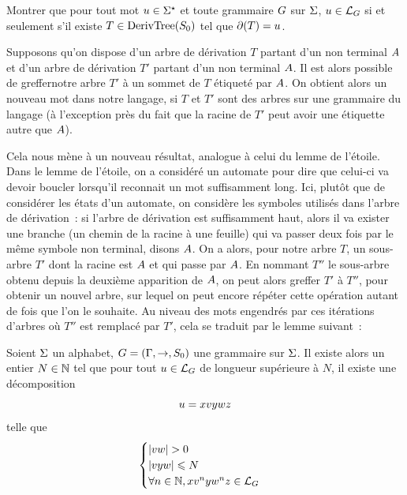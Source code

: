 \begin{exercise}
  Montrer que pour tout mot $u\in\Sigma^{\star}$ et toute grammaire $G$ sur
  $\Sigma$, $u \in \mathcal L_{G}$ si et seulement s'il existe
  $T \in \operatorname{DerivTree}(S_{0})$ tel que $\mathbin{\partial}(T) = u$.
\end{exercise}

Supposons qu'on dispose d'un arbre de dérivation $T$ partant d'un non terminal
$A$ et d'un arbre de dérivation $T'$ partant d'un non terminal $A$. Il est
alors possible de \og greffer\fg notre arbre $T'$ à un sommet de $T$ étiqueté
par $A$. On obtient alors un nouveau mot dans notre langage, si $T$ et $T'$
sont des arbres sur une grammaire du langage (à l'exception près du fait que la
racine de $T'$ peut avoir une étiquette autre que $A$).

Cela nous mène à un nouveau résultat, analogue à celui du lemme de l'étoile.
Dans le lemme de l'étoile, on a considéré un automate pour dire que celui-ci va
devoir boucler lorsqu'il reconnait un mot suffisamment long. Ici, plutôt que de
considérer les états d'un automate, on considère les symboles utilisés dans
l'arbre de dérivation~: si l'arbre de dérivation est suffisamment haut, alors
il va exister une branche (un chemin de la racine à une feuille) qui va passer
deux fois par le même symbole non terminal, disons $A$. On a alors, pour
notre arbre $T$, un sous-arbre $T'$ dont la racine est $A$ et qui passe par
$A$. En nommant $T''$ le sous-arbre obtenu depuis la deuxième apparition de
$A$, on peut alors greffer $T'$ à $T''$, pour obtenir un nouvel arbre, sur
lequel on peut encore répéter cette opération autant de fois que l'on le
souhaite. Au niveau des mots engendrés par ces itérations d'arbres où $T''$ est
remplacé par $T'$, cela se traduit par le lemme suivant~:

\begin{lemma}[Itération]
  Soient $\Sigma$ un alphabet, $G = (\Gamma,\to,S_{0})$ une grammaire sur
  $\Sigma$.
  Il existe alors un entier $N \in \mathbb N$ tel que pour tout
  $u \in \mathcal L_{G}$ de longueur supérieure à $N$, il existe une
  décomposition
  \[u = x v y w z\]
  telle que
  \[\begin{cases}
  |vw| > 0\\
  |vyw| \leqslant N\\
  \forall n \in \mathbb N, x v^n y w^n z \in \mathcal L_{G}
  \end{cases}\]
\end{lemma}

